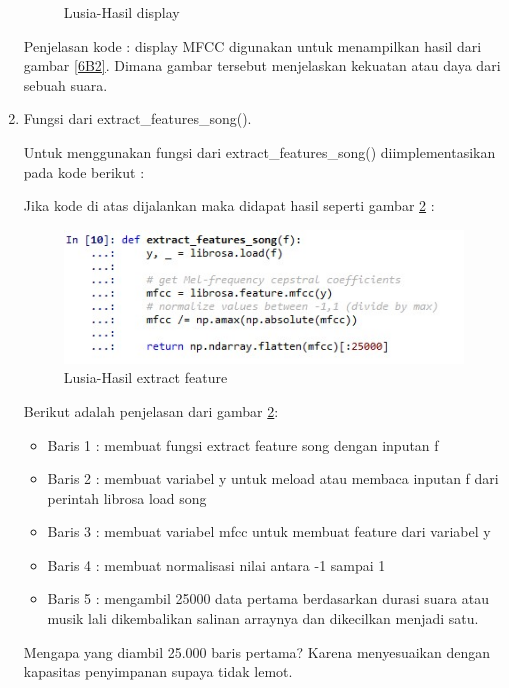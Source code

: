 \begin{enumerate}
\begin{figure}[!hbtp]
		\caption{Lusia-Hasil display}
		\label{6B3}
		\end{figure}
	\par Penjelasan kode : display MFCC digunakan untuk menampilkan hasil dari gambar \ref{6B2}. Dimana gambar tersebut menjelaskan kekuatan atau daya dari sebuah suara.

\item Fungsi dari extract\_features\_song().
	\par Untuk menggunakan fungsi dari extract\_features\_song() diimplementasikan pada kode berikut :
	
	\par Jika kode di atas dijalankan maka didapat hasil seperti gambar \ref{6B4} :
		\begin{figure}[!hbtp]
		\centering
		\includegraphics[scale=0.4]{figures/t3.jpg}
		\caption{Lusia-Hasil extract feature}
		\label{6B4}
		\end{figure}
	\par Berikut adalah penjelasan dari gambar \ref{6B4}:
	\begin{itemize}
	\item Baris 1 : membuat fungsi extract feature song dengan inputan f
	\item Baris 2 : membuat variabel y untuk meload atau membaca inputan f dari perintah librosa load song
	\item Baris 3 : membuat variabel mfcc untuk membuat feature dari variabel y
	\item Baris 4 : membuat normalisasi nilai antara -1 sampai 1
	\item Baris 5 : mengambil 25000 data pertama berdasarkan durasi suara atau musik lali dikembalikan salinan arraynya dan dikecilkan menjadi satu.
	\end{itemize}
	
	\par  Mengapa yang diambil 25.000 baris pertama? Karena menyesuaikan dengan kapasitas penyimpanan supaya tidak lemot.


\end{enumerate}
